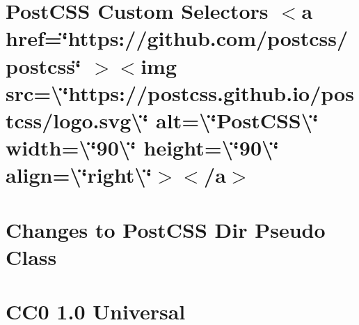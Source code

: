 \documentclass[twoside]{book}
\newcommand{\+}{\discretionary{\mbox{\scriptsize$\hookleftarrow$}}{}{}}
\begin{document}
\chapter{Post\+CSS Custom Selectors \texorpdfstring{$<$}{<}a href=\char`\"{}https\+://github.\+com/postcss/postcss\char`\"{} \texorpdfstring{$>$}{>}\texorpdfstring{$<$}{<}img src=\textbackslash{}\char`\"{}https\+://postcss.\+github.\+io/postcss/logo.\+svg\textbackslash{}\char`\"{} alt=\textbackslash{}\char`\"{}\+Post\+CSS\textbackslash{}\char`\"{} width=\textbackslash{}\char`\"{}90\textbackslash{}\char`\"{} height=\textbackslash{}\char`\"{}90\textbackslash{}\char`\"{} align=\textbackslash{}\char`\"{}right\textbackslash{}\char`\"{}\texorpdfstring{$>$}{>}\texorpdfstring{$<$}{<}/a\texorpdfstring{$>$}{>}}
\label{md__c___users_vaishnavi_jadhav__desktop__developer_code_mean_stack_example_client_node_modules_p22cec7b9f56296d53d1347fd623b0e4a}

\chapter{Changes to Post\+CSS Dir Pseudo Class}
\label{md__c___users_vaishnavi_jadhav__desktop__developer_code_mean_stack_example_client_node_modules_p53fd7002ff7f5553c7f3a5eee9fe1dcd}

\chapter{CC0 1.0 Universal}
\label{md__c___users_vaishnavi_jadhav__desktop__developer_code_mean_stack_example_client_node_modules_p363fc4fc315ccd8b0c904335e9a40cb4}

\end{document}
